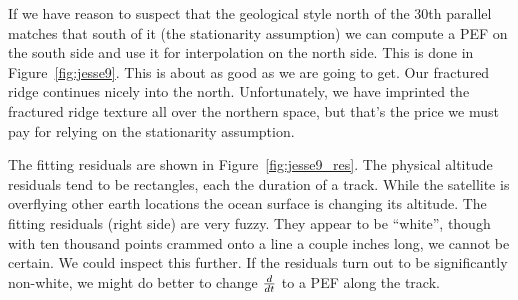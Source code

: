
\par
If we have reason to suspect that the geological style north of
the 30th parallel matches that south of it
(the stationarity assumption) we can compute a PEF on the south side
and use it for interpolation on the north side.
This is done in Figure~\ref{fig:jesse9}.
This is about as good as we are going to get.
Our fractured ridge continues nicely into the north.
Unfortunately, we have imprinted the fractured ridge
texture all over the northern space,
but that's the price we must pay for relying on the stationarity assumption.

\par
The fitting residuals
are shown in Figure~\ref{fig:jesse9_res}.
The physical altitude residuals tend to be rectangles,
each the duration of a track.
While the satellite is overflying other earth locations the ocean surface
is changing its altitude.
The fitting residuals (right side) are very fuzzy.
They appear to be ``white'', though with ten thousand points
crammed onto a line a couple inches long, we cannot be certain.
We could inspect this further.
If the residuals turn out to be significantly non-white,
we might do better to change $d\over dt$ to a PEF along the track.


















